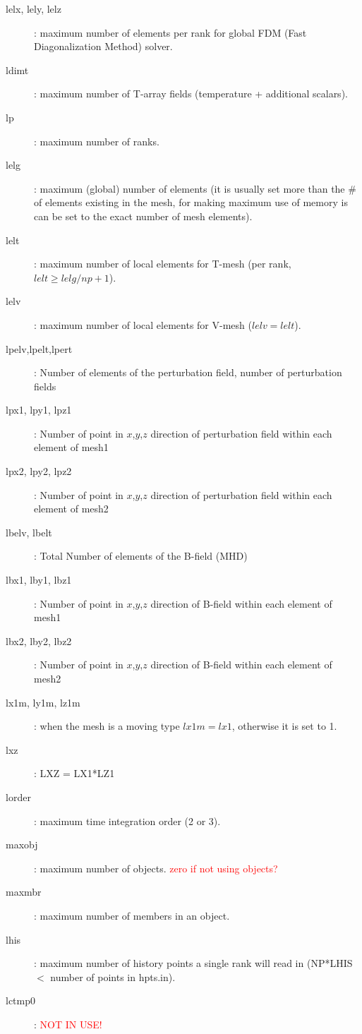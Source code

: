 \begin{description}
\item [lelx, lely, lelz]: maximum number of elements per rank for global FDM (Fast Diagonalization Method) solver.
\item [ldimt]:  maximum number of T-array fields (temperature + additional scalars).
\item [lp]: maximum number of ranks.
\item [lelg]: maximum (global) number of elements (it is usually set more than the \# of elements existing in the mesh, for making maximum use of memory is can be set to the exact number of mesh elements).\\
\item [lelt]: maximum number of local elements for T-mesh (per rank, $lelt \geq lelg/np +1 $).
\item [lelv]: maximum number of local elements for V-mesh ($lelv = lelt$).
\item [lpelv,lpelt,lpert ]: Number of elements of the perturbation field, number of perturbation fields
\item [lpx1, lpy1, lpz1]: Number of point in $x$,$y$,$z$ direction of perturbation field within each element of mesh1
\item [lpx2, lpy2, lpz2]: Number of point in $x$,$y$,$z$ direction of perturbation field within each element of mesh2
\item [lbelv, lbelt]: Total Number of elements of the B-field (MHD)
\item [lbx1, lby1, lbz1]: Number of point in $x$,$y$,$z$ direction of B-field within each element of mesh1
\item [lbx2, lby2, lbz2]: Number of point in $x$,$y$,$z$ direction of B-field within each element of mesh2
\item [lx1m, ly1m, lz1m]: when the mesh is a moving type $lx1m=lx1$, otherwise it is set to 1.
\item [lxz] : LXZ = LX1*LZ1\\
\item [lorder]: maximum time integration order (2 or 3).
\item [maxobj]: maximum number of objects. {\textcolor{red}{zero if not using objects?}}
\item [maxmbr]: maximum number of members in an object.
\item [lhis]: maximum number of history points a single rank will read in (NP*LHIS $<$ number of points in hpts.in).
\item [lctmp0] : {\textcolor{red}{NOT IN USE!}} \\

\end{description}
